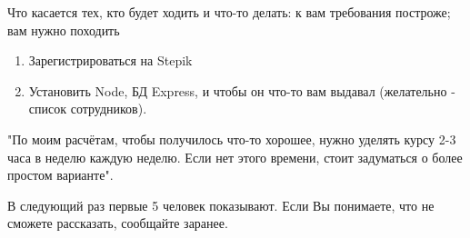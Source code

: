 \documentclass[main.tex]{subfiles}
\begin{document}
Что касается тех, кто будет ходить и что-то делать: к вам требования построже; вам нужно походить

\begin{enumerate}[noitemsep]
    \item Зарегистрироваться на Stepik
    \item Установить Node, БД Express, и чтобы он что-то вам выдавал (желательно - список сотрудников).
\end{enumerate}



"По моим расчётам, чтобы получилось что-то хорошее, нужно уделять курсу 2-3 часа в неделю каждую неделю. Если нет этого времени, стоит задуматься о более простом варианте".

В следующий раз первые 5 человек показывают. Если Вы понимаете, что не сможете рассказать, сообщайте заранее.
\end{document}
